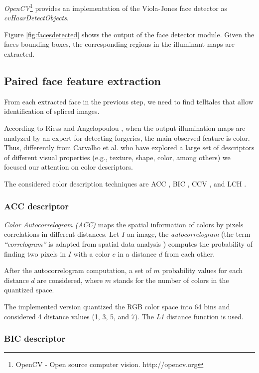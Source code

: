 \emph{OpenCV}\footnote{OpenCV - Open source computer vision. http://opencv.org} provides an implementation of the Viola-Jones face detector as \emph{cvHaarDetectObjects}.

Figure \ref{fig:facesdetected} shows the output of the face detector module. Given the faces bounding boxes, the corresponding regions in the illuminant maps are extracted.

\subsection{Paired face feature extraction}

From each extracted face in the previous step, we need to find telltales that allow identification of spliced images. 

According to Riess and Angelopoulou \cite{riess2010scene}, when the output illumination maps are analyzed by an expert for detecting forgeries, the main observed feature is color. Thus, differently from Carvalho et al. \cite{carvalho2016illuminant} who have explored a large set of descriptors of different visual properties (e.g., texture, shape, color, among others) we focused our attention on color descriptors.

The considered color description techniques are ACC \cite{huang1997image}, BIC \cite{stehling2002compact}, CCV \cite{pass1997comparing}, and LCH \cite{swain1991color}.

\subsubsection{ACC descriptor}

\emph{Color Autocorrelogram (ACC) }\cite{huang1997image} maps the spatial information of colors by pixels correlations in different distances. Let $I$ an image, the \emph{autocorrelogram} (the term \emph{“correlogram”} is adapted from spatial data analysis \cite{upton1985spatial}) computes the probability of finding two pixels in $I$ with a color $c$ in a distance $d$ from each other. 

After the autocorrelogram computation, a set of $m$  probability values for each distance $d$ are considered, where $m$ stands for the number of colors in the quantized space. 

The implemented version quantized the RGB color space into 64 bins and considered 4 distance values (1, 3, 5, and 7). The \emph{L1} distance function is used.

\subsubsection{BIC descriptor}

